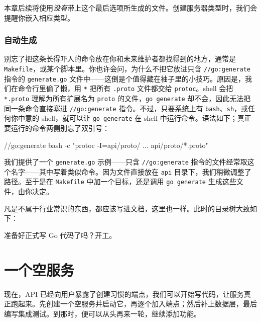 本章后续将使用\emph{没有}带上这个最后选项所生成的文件。创建服务器类型时，我们会提醒你嵌入相应类型。

\subsubsection{自动生成}

别忘了把这条长得吓人的命令放在你和未来维护者都找得到的地方，通常是 \texttt{Makefile}，或某个脚本里。你也许会问，为什么不把它放进只含 \texttt{//go:generate} 指令的 \texttt{generate.go} 文件中——这倒是个值得藏在袖子里的小技巧。原因是，我们在命令行里偷了懒，用 \texttt{*} 把所有 \texttt{.proto} 文件都交给 \texttt{protoc}。shell 会把 \texttt{*.proto} 理解为所有扩展名为 \texttt{proto} 的文件，\texttt{go generate} 却不会，因此无法把同一条命令直接塞进 \texttt{//go:generate} 指令。不过，只要系统上有 \texttt{bash}、\texttt{sh}，或任何你中意的 shell，就可以让 \texttt{go generate} 在 shell 中运行命令。语法如下；真正要运行的命令两侧别忘了双引号：

\begin{gocode}[]
//go:generate bash -c "protoc -I=api/proto/ {...} api/proto/*.proto"
\end{gocode}

我们提供了一个 \texttt{generate.go} 示例——只含 \texttt{//go:generate} 指令的文件经常取这个名字——其中写着类似命令。因为文件直接放在 \texttt{api} 目录下，我们稍微调整了路径。至于是在 \texttt{Makefile} 中加一个目标，还是调用 \texttt{go generate} 生成这些文件，由你决定。

凡是不属于行业常识的东西，都应该写进文档，这里也一样。此时的目录树大致如下：

\begin{treebox}
\end{treebox}

准备好正式写 Go 代码了吗？开工。

\section{一个空服务}

现在，API 已经向用户暴露了创建习惯的端点，我们可以开始写代码，让服务真正跑起来。先创建一个空服务并启动它，再逐个加入端点；然后补上数据层，最后编写集成测试。到那时，便可以从头再来一轮，继续添加功能。

